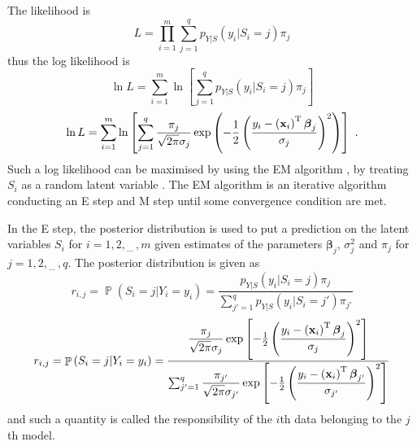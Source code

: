 \documentclass[12pt]{report}
\DeclareMathOperator{\prob}{\mathbb{P}}
\newcommand{\T}{^\textup{T}}
\newcommand{\dotdotdot}{_{\phantom{.}\cdots}}
\newcommand{\vect}[1]{\mathbf{#1}}
\newcommand{\vectGreek}[1]{\boldsymbol{#1}}
\begin{document}
The likelihood is
\begin{equation*}
L=\prod_{i=1}^m\sum_{j=1}^qp_{Y|S}\left(y_i|S_i=j\right)\pi_j
\end{equation*}
thus the log likelihood is
\begin{equation*}
\ln{L}=\sum_{i=1}^m\ln\left[
\sum_{j=1}^qp_{Y|S}\left(y_i|S_i=j\right)\pi_j
\right]
\end{equation*}
\begin{equation}
\ln{L}=\sum_{i=1}^m\ln\left[
\sum_{j=1}^q \frac{\pi_j}{\sqrt{2\pi}\sigma_j}\exp\left(-\frac{1}{2}\left(\frac{y_i-\left(\vect{x}_i\right)\T\vectGreek{\beta}_j}{\sigma_j}\right)^2\right) 
\right] \ .
\label{eq:mixtureLinear_logLikelihood}
\end{equation}
Such a log likelihood can be maximised by using the EM algorithm \cite{dempster1977maximum}, by treating $S_i$ as a random latent variable \cite[pp.~260-261]{barber2012bayesian}. The EM algorithm is an iterative algorithm conducting an E step and M step until some convergence condition are met.

In the E step, the posterior distribution is used to put a prediction on the latent variables $S_i$ for $i=1,2,\dotdotdot,m$ given estimates of the parameters $\vectGreek{\beta}_j$, $\sigma_j^2$ and $\pi_j$ for $j=1,2,\dotdotdot,q$. The posterior distribution is given as
\begin{equation*}
r_{i,j}=\prob\left(S_i=j|Y_i=y_i\right)=\frac
{p_{Y|S}\left(y_i|S_i=j\right)\pi_j}
{\sum_{j'=1}^qp_{Y|S}\left(y_i|S_i=j'\right)\pi_{j'}}
\end{equation*}
\begin{equation}
r_{i,j}=\prob\left(S_i=j|Y_i=y_i\right)=\dfrac
{\dfrac{\pi_j}{\sqrt{2\pi}\sigma_j}\exp\left[-\frac{1}{2}\left(\dfrac{y_i-\left(\vect{x}_i\right)\T\vectGreek{\beta}_j}{\sigma_j}\right)^2\right] }
{\sum_{j'=1}^q\dfrac{\pi_{j'}}{\sqrt{2\pi}\sigma_{j'}}\exp\left[-\frac{1}{2}\left(\dfrac{y_i-\left(\vect{x}_i\right)\T\vectGreek{\beta}_{j'}}{\sigma_{j'}}\right)^2\right] }
\end{equation}
and such a quantity is called the responsibility of the $i$th data belonging to the $j$th model.
\end{document}
